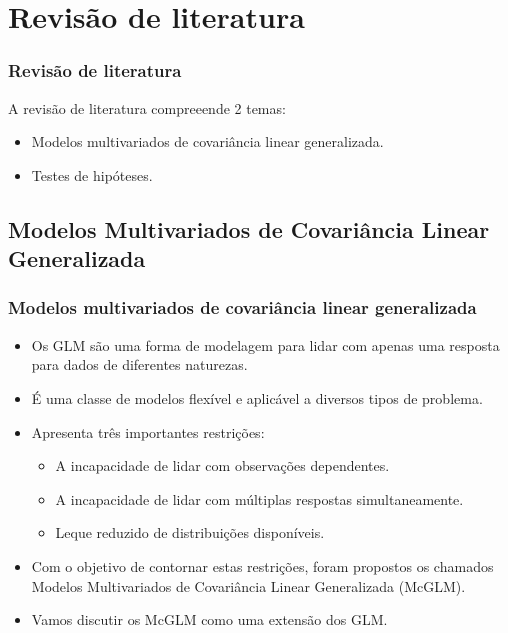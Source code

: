 \documentclass[handout,serif, professionalfont, usenames, dvipsnames, aspectratio = 169]{beamer}\usepackage[]{graphicx}\usepackage[]{color}
\begin{document}
\section{Revisão de literatura}


\begin{frame}
  \frametitle{Revisão de literatura}
  
  A revisão de literatura compreeende 2 temas:
  
  \begin{itemize}
    \itemsep 2ex
  \item Modelos multivariados de covariância linear generalizada. 
  \item Testes de hipóteses. 
  \end{itemize}
\end{frame}


\subsection{Modelos Multivariados de Covariância Linear Generalizada}


\begin{frame}
  \frametitle{Modelos multivariados de covariância linear generalizada}
  \begin{itemize}
    \itemsep 2ex
  
  \item Os GLM são uma forma de modelagem para lidar com apenas uma resposta para dados de diferentes naturezas.  
  
  \item É uma classe de modelos flexível e aplicável a diversos tipos de problema.  
  
  \item Apresenta três importantes restrições:
    \begin{itemize}
      \item A incapacidade de lidar com observações dependentes. 
      \item A incapacidade de lidar com múltiplas respostas simultaneamente.
      \item Leque reduzido de distribuições disponíveis. 
    \end{itemize}

  \item Com o objetivo de contornar estas restrições, foram propostos os chamados Modelos Multivariados de Covariância Linear Generalizada (McGLM).
  
  \item Vamos discutir os McGLM como uma extensão dos GLM. 
  
  \end{itemize}
\end{frame}
\end{document}
